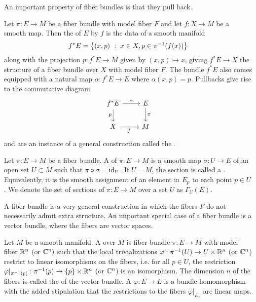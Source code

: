 %
An important property of fiber bundles is that they pull back.
\begin{defn}
Let $\pi : E \to M$ be a fiber bundle with model fiber $F$
and let $f : X \to M$ be a smooth map. Then the  of $E$ by $f$ is
the data of a smooth manifold
\[
f^*E = \left\lbrace (x, p)~:~ x \in X, p \in \pi^{-1}(f(x))  \right\rbrace
\]
along with the projection $p : f^*E \to M$ given by $(x,p) \mapsto x$, giving
$f^*E \to X$ the structure of a fiber bundle over $X$ with model fiber $F$.
The bundle $f^*E$ also comes equipped with a natural map $\alpha : f^*E \to E$
where $\alpha(x,p) = p$. Pullbacks give rise to the commutative diagram
\[\begin{tikzcd}
f^*E \ar[d, "p"']\ar[r, "\alpha"] & E \ar[d, "\pi"] \\
X \ar[r, "f"']& M
\end{tikzcd}\]
and are an instance of a general construction called the .
\end{defn}
%
\begin{defn}
Let $\pi : E \to M$ be a fiber bundle. A  of $\pi : E \to M$
is a smooth map $\sigma : U \to E$ of an open set $U \subset M$ such that
$\pi \circ \sigma = \operatorname{id}_U$. If $U = M$, the section is called a .
Equivalently, it is the smooth assignment of an element in $E_p$ to each point
$p \in U$. We denote the set of sections of $\pi : E \to M$ over a set $U$
as $\Gamma_U(E)$.
\end{defn}
%
A fiber bundle is a very general construction in which the fibers $F$ do
not necessarily admit extra structure. An important special case of a fiber bundle
is a vector bundle, where the fibers are vector spaces.
%
\begin{defn}
Let $M$ be a smooth manifold. A  over $M$ is fiber bundle
$\pi : E \to M$ with model fiber $\mathbb{R}^n$ (or $\mathbb{C}^n)$ such that the local
trivializations $\varphi : \pi^{-1}(U) \to U \times \mathbb{R}^n$ (or $\mathbb{C}^n$)
restrict to linear isomorphisms on the fibers, i.e. for all $p \in U$, the restriction
$\varphi\vert_{\pi^{-1}(p)} : \pi^{-1}(p) \to \left\lbrace p \right\rbrace \times \mathbb{R}^n$
(or $\mathbb{C}^n$) is an isomorphism. The dimension $n$ of the fibers is called the
 of the vector bundle. A 
$\varphi : E \to L$ is a bundle homomorphism with the added stipulation that
the restrictions to the fibers $\varphi\vert_{E_x}$ are linear maps.
\end{defn}
%
